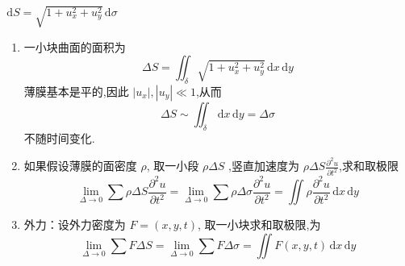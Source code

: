 \documentclass[../../PDE.tex]{subfiles}
\begin{document}
\(  \,\mathrm{d} S =  \sqrt{1+ u_{x}^{2}+ u_{y}^{2} }\,\mathrm{d}  \sigma  \) 

\begin{enumerate}
    \item 一小块曲面的面积为 \[
        \Delta S  =  \iint_{ \delta   }\sqrt{1+ u_{x}^{2}+ u_{y}^{2}}\,\mathrm{d} x\,\mathrm{d} y
       \]薄膜基本是平的,因此 \(  \left| u_{x} \right| ,\left| u_{y} \right|\ll 1    \),从而 \[
           \Delta S \sim  \iint_{  \delta   }\,\mathrm{d} x\,\mathrm{d} y =     \Delta  \sigma 
       \] 不随时间变化.
       \item 如果假设薄膜的面密度 \(  \rho   \), 取一小段 \(  \rho  \Delta S  \) ,竖直加速度为 \(  \rho  \Delta S \frac{\partial ^{2}u}{\partial t^{2}}  \),求和取极限 \[
        \lim_{ \Delta  \to 0} \sum  \rho   \Delta S \frac{\partial ^{2}u}{\partial t^{2}} =  \lim_{ \Delta  \to 0} \sum \rho  \Delta  \sigma \frac{\partial ^{2}u}{\partial t^{2}} =  \iint \rho \frac{\partial ^{2}u}{\partial t^{2}}\,\mathrm{d} x\,\mathrm{d} y
        \]
        \item 外力：设外力密度为 \(  F  = \left( x,y,t \right) \), 取一小块求和取极限,为 \[
            \lim_{ \Delta  \to 0} \sum F  \Delta S =  \lim_{ \Delta  \to 0} \sum F \Delta  \sigma = \iint F\left( x,y,t \right)\,\mathrm{d} x\,\mathrm{d} y  
            \]


\end{enumerate}
\end{document}
